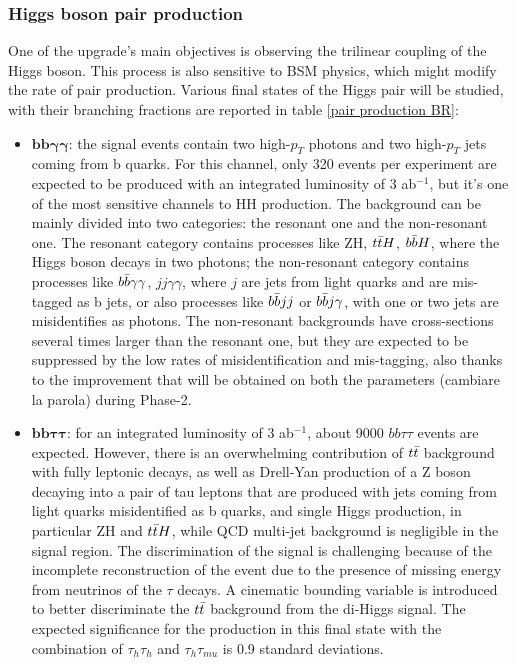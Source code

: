 \subsubsection{Higgs boson pair production}
One of the upgrade's main objectives is observing the trilinear coupling of the Higgs boson. This process is also sensitive to BSM physics, which might modify the rate of pair production. Various final states of the Higgs pair will be studied, with their branching fractions are reported in table \ref{pair production BR}:
\begin{itemize}
    \item $\bm{bb\gamma\gamma}$: the signal events contain two high-$p_T$ photons and two high-$p_T$ jets coming from b quarks. For this channel, only 320 events per experiment are expected to be produced with an integrated luminosity of 3 ab$^{-1}$, but it's one of the most sensitive channels to HH production. The background can be mainly divided into two categories: the resonant one and the non-resonant one. The resonant category contains processes like ZH, $t\Bar{t}H$, $b\Bar{b}H$, where the Higgs boson decays in two photons; the non-resonant category contains processes like $b\Bar{b}\gamma\gamma$, $jj\gamma\gamma$, where $j$ are jets from light quarks and are mis-tagged as b jets, or also processes like $b\Bar{b}jj$ or $b\Bar{b}j\gamma$, with one or two jets are misidentifies as photons. The non-resonant backgrounds have cross-sections several times larger than the resonant one, but they are expected to be suppressed by the low rates of misidentification and mis-tagging, also thanks to the improvement that will be obtained on both the parameters (cambiare la parola) during Phase-2.
    \item $\bm{bb\tau\tau}$: for an integrated luminosity of 3 ab$^{-1}$, about 9000 $bb\tau\tau$ events are expected. However, there is an overwhelming contribution of $t\Bar{t}$ background with fully leptonic decays, as well as Drell-Yan production of a Z boson decaying into a pair of tau leptons that are produced with jets coming from light quarks misidentified as b quarks, and single Higgs production, in particular ZH and $t\Bar{t}H$, while QCD multi-jet background is negligible in the signal region. The discrimination of the signal is challenging because of the incomplete reconstruction of the event due to the presence of missing energy from neutrinos of the $\tau$ decays. A cinematic bounding variable is introduced to better discriminate the $t\Bar{t}$ background from the di-Higgs signal. The expected significance for the production in this final state with the combination of $\tau_h \tau_h$ and $\tau_h \tau_{mu}$ is 0.9 standard deviations.\\

\end{itemize}
